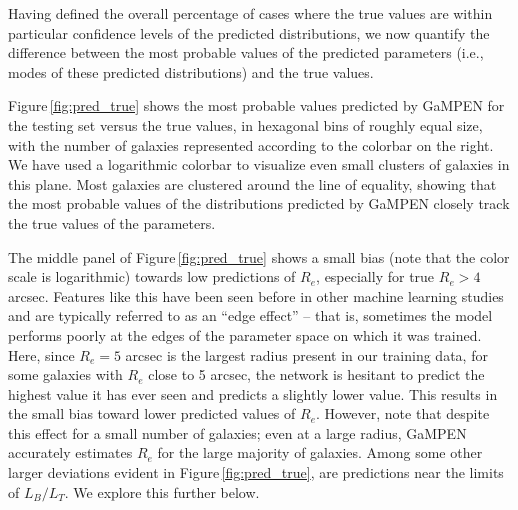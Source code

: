 \documentclass[twocolumn]{aastex63}
\newcommand\gampen{GaMPEN}
\begin{document}
\begin{CJK*}{UTF8}{gbsn}

Having defined the overall percentage of cases where the true values are within particular confidence levels of the predicted distributions, we now quantify the difference between the most probable values of the predicted parameters (i.e., modes of these predicted distributions) and the true values. 

Figure\,\ref{fig:pred_true} shows the most probable values predicted by \gampen{} for the testing set versus the true values, %
in hexagonal bins of roughly equal size, with the number of galaxies represented according to the colorbar on the right. %
We have used a logarithmic colorbar to visualize even small clusters of galaxies in this plane. 
Most galaxies are clustered around the line of equality, showing that the most probable values of the distributions predicted by \gampen{} closely track the true values of the parameters. 

The middle panel of Figure\,\ref{fig:pred_true} shows a small bias (note that the color scale is logarithmic) towards low predictions of $R_e$, especially for true $R_e > 4$ arcsec. Features like this have been seen before in other machine learning studies and are typically referred to as an “edge effect” -- that is, sometimes the model performs poorly at the edges of the parameter space on which it was trained. Here, since $R_e=5$ arcsec is the largest radius present in our training data, for some galaxies with $R_e$ close to 5 arcsec, the network is hesitant to predict the highest value it has ever seen and predicts a slightly lower value. This results in the small bias toward lower predicted values of $R_e$. However, note that despite this effect for a small number of galaxies; even at a  large radius, \gampen{} accurately estimates $R_e$ for the large majority of galaxies. Among some other larger deviations evident in Figure\,\ref{fig:pred_true}, are predictions near the limits of $L_B/L_T$. We explore this further below. 


\end{CJK*}
\end{document}
